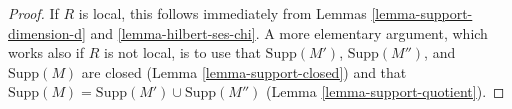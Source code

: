 \begin{proof}
If $R$ is local, this follows immediately from
Lemmas \ref{lemma-support-dimension-d} and \ref{lemma-hilbert-ses-chi}.
A more elementary argument, which works also if $R$ is not local,
is to use that $\text{Supp}(M')$, $\text{Supp}(M'')$, and
$\text{Supp}(M)$ are closed (Lemma \ref{lemma-support-closed})
and that $\text{Supp}(M) = \text{Supp}(M') \cup \text{Supp}(M'')$
(Lemma \ref{lemma-support-quotient}).
\end{proof}










